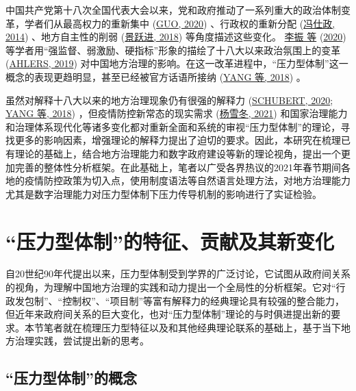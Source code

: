 \documentclass[
  12pt,
]{ctexart}
\begin{document}
中国共产党第十八次全国代表大会以来，党和政府推动了一系列重大的政治体制变革，学者们从最高权力的重新集中 (\protect\hyperlink{ref-Guo2020}{GUO, 2020}) 、行政权的重新分配 (\protect\hyperlink{ref-FengShiZheng2014}{冯仕政, 2014}) 、地方自主性的削弱 (\protect\hyperlink{ref-JingYueJin2018}{景跃进, 2018}) 等角度描述这些变化。 \protect\hyperlink{ref-LiZhenEtAl2020}{李振 等} (\protect\hyperlink{ref-LiZhenEtAl2020}{2020}) 等学者用``强监督、弱激励、硬指标''形象的描绘了十八大以来政治氛围上的变革 (\protect\hyperlink{ref-Ahlers2019}{AHLERS, 2019}) 对中国地方治理的影响。在这一改革进程中，``压力型体制''这一概念的表现更趋明显，甚至已经被官方话语所接纳 (\protect\hyperlink{ref-YangYan2018}{YANG 等, 2018}) 。

虽然对解释十八大以来的地方治理现象仍有很强的解释力 (\protect\hyperlink{ref-Schubert2020}{SCHUBERT, 2020}; \protect\hyperlink{ref-YangYan2018}{YANG 等, 2018}) ，但疫情防控新常态的现实需求 (\protect\hyperlink{ref-YangXueDong2021}{杨雪冬, 2021})
和国家治理能力和治理体系现代化等诸多变化都对重新全面和系统的审视``压力型体制''的理论，寻找更多的影响因素，增强理论的解释力提出了迫切的要求。因此，本研究在梳理已有理论的基础上，结合地方治理能力和数字政府建设等新的理论视角，提出一个更加完善的整体性分析框架。在此基础上，笔者以广受各界热议的2021年春节期间各地的疫情防控政策为切入点，使用制度语法等自然语言处理方法，对地方治理能力尤其是数字治理能力对压力型体制下压力传导机制的影响进行了实证检验。

\hypertarget{ux538bux529bux578bux4f53ux5236ux7684ux7279ux5f81ux8d21ux732eux53caux5176ux65b0ux53d8ux5316}{%
\section{``压力型体制''的特征、贡献及其新变化}\label{ux538bux529bux578bux4f53ux5236ux7684ux7279ux5f81ux8d21ux732eux53caux5176ux65b0ux53d8ux5316}}

自20世纪90年代提出以来，压力型体制受到学界的广泛讨论，它试图从政府间关系的视角，为理解中国地方治理的实践和动力提出一个全局性的分析框架。它对``行政发包制''、``控制权''、``项目制''等富有解释力的经典理论具有较强的整合能力，但近年来政府间关系的巨大变化，也对``压力型体制''理论的与时俱进提出新的要求。本节笔者就在梳理压力型特征以及和其他经典理论联系的基础上，基于当下地方治理实践，尝试提出新的思考。

\hypertarget{ux538bux529bux578bux4f53ux5236ux7684ux6982ux5ff5}{%
\subsection{``压力型体制''的概念}\label{ux538bux529bux578bux4f53ux5236ux7684ux6982ux5ff5}}
\end{document}
